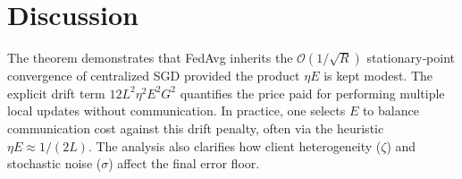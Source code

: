 \documentclass{article}
\begin{document}
\section*{Discussion}
The theorem demonstrates that FedAvg inherits the $\mathcal{O}(1/\sqrt{R})$
stationary‑point convergence of centralized SGD provided the product
$\eta E$ is kept modest.  The explicit drift term
$12L^2\eta^2E^2G^2$ quantifies the price paid for performing multiple local
updates without communication.  In practice, one selects $E$ to balance
communication cost against this drift penalty, often via the heuristic
$\eta E\approx 1/(2L)$.  The analysis also clarifies how client
heterogeneity ($\zeta$) and stochastic noise ($\sigma$) affect the final
error floor.
\end{document}
